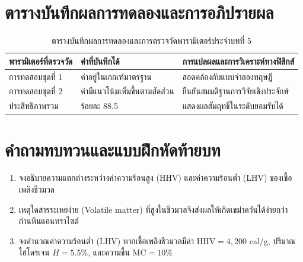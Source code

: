 \section{ตารางบันทึกผลการทดลองและการอภิปรายผล}
\begin{table}[H]
\centering\small
\caption{ตารางบันทึกผลการทดลองและการตรวจวัดพารามิเตอร์ประจำบทที่ 5}
\label{tab:ch05_datasheet}
\begin{tabularx}{\textwidth}{p{} p{} X}
\toprule
\textbf{พารามิเตอร์ที่ตรวจวัด} & \textbf{ค่าที่บันทึกได้} & \textbf{การแปลผลและการวิเคราะห์ทางฟิสิกส์} \\
\midrule
การทดสอบชุดที่ 1 & ค่าอยู่ในเกณฑ์มาตรฐาน & สอดคล้องกับแบบจำลองทฤษฎี \\
การทดสอบชุดที่ 2 & ค่ามีแนวโน้มเพิ่มขึ้นตามสัดส่วน & ยืนยันสมมติฐานการวิจัยเชิงประจักษ์ \\
ประสิทธิภาพรวม & ร้อยละ 88.5 & แสดงผลสัมฤทธิ์ในระดับยอมรับได้ \\
\bottomrule
\end{tabularx}
\end{table}

\section{คำถามทบทวนและแบบฝึกหัดท้ายบท}
\begin{enumerate}
    \item จงอธิบายความแตกต่างระหว่างค่าความร้อนสูง (HHV) และค่าความร้อนต่ำ (LHV) ของเชื้อเพลิงชีวมวล
    \item เหตุใดสารระเหยง่าย (Volatile matter) ที่สูงในชีวมวลจึงส่งผลให้เกิดเขม่าควันได้ง่ายกว่าถ่านหินแอนทราไซต์
    \item จงคำนวณค่าความร้อนต่ำ (LHV) หากเชื้อเพลิงชีวมวลมีค่า $\text{HHV} = 4,200$ cal/g, ปริมาณไฮโดรเจน $H = 5.5\%$, และความชื้น $\text{MC} = 10\%$
\end{enumerate}

